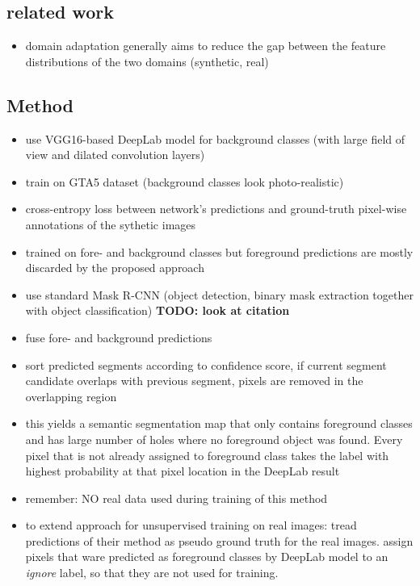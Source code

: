 \documentclass[]{article}
\newcommand{\todo}[1]{{\color{red}\bf{TODO: #1}}}
\begin{document}
\subsection{related work}

\begin{itemize}
	\item domain adaptation generally aims to reduce the gap between the feature distributions of the two domains (synthetic, real)
\end{itemize}

\subsection{Method}

\begin{itemize}
	\item use VGG16-based DeepLab model for background classes (with large field of view and dilated convolution layers)
	\item train on GTA5 dataset (background classes look photo-realistic)
	\item cross-entropy loss between network's predictions and ground-truth pixel-wise annotations of the sythetic images
	\item trained on fore- and background classes but foreground predictions are mostly discarded by the proposed approach
	\item use standard Mask R-CNN (object detection, binary mask extraction together with object classification) \todo{look at citation}
	\item fuse fore- and background predictions
	\item sort predicted segments according to confidence score, if current segment candidate overlaps with previous segment, pixels are removed in the overlapping region
	\item this yields a semantic segmentation map that only contains foreground classes and has large number of holes where no foreground object was found. Every pixel that is not already assigned to foreground class takes the label with highest probability at that pixel location in the DeepLab result
	\item remember: NO real data used during training of this method
	\item to extend approach for unsupervised training on real images: tread predictions of their method as pseudo ground truth for the real images. assign pixels that ware predicted as foreground classes by DeepLab model to an \textit{ignore} label, so that they are not used for training. 
\end{itemize}
\end{document}
